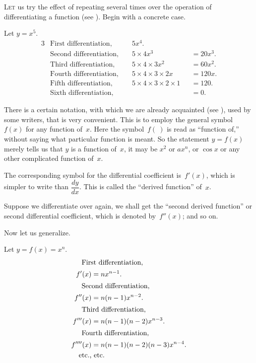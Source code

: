 \documentclass[12pt]{book}[2005/09/16]
\newcommand{\DPPageSep}[2]{\Pagelabel{#2}}
\newcommand{\Pagelabel}[1]
  {\phantomsection\label{#1}}
\newcommand{\Pageref}[2][p.]{%
  \ifthenelse{\not\equal{#1}{}}{%
    \hyperref[#2]{#1~\pageref*{#2}}%
  }{%
    \hyperref[#2]{\pageref{*#2}}%
  }%
}
\newcommand{\First}[1]{\noindent\textsc{#1}}
\begin{document}
\First{Let} us try the effect of repeating several times over
the operation of differentiating a function (see \Pageref{function}).
Begin with a concrete case.

Let $y = x^5$.
\begin{alignat*}{3}
&\text{First differentiation, }  &&5x^4.              &&         \\
&\text{Second differentiation, } &&5 × 4x^3           &&= 20x^3. \\
&\text{Third differentiation, }  &&5 × 4 × 3x^2       &&= 60x^2. \\
&\text{Fourth differentiation, } &&5 × 4 × 3 × 2x     &&= 120x.  \\
&\text{Fifth differentiation, }  &&5 × 4 × 3 × 2 × 1  &&= 120.   \\
&\text{Sixth differentiation, }  &&                   &&= 0.
\end{alignat*}

There is a certain notation, with which we are
already acquainted (see \Pageref{notation}), used by some writers,
that is very convenient. This is to employ the
general symbol~$f(x)$ for any function of~$x$. Here
the symbol~$f(~)$ is read as ``function of,'' without
saying what particular function is meant. So the
statement $y=f(x)$ merely tells us that $y$ is a function
of~$x$, it may be $x^2$ or $ax^n$, or $\cos x$ or any other complicated
function of~$x$.

The corresponding symbol for the differential coefficient
is~$f'(x)$, which is simpler to write than $\dfrac{dy}{dx}$.
This is called the ``derived function'' of~$x$.
\DPPageSep{062.png}{50}%

Suppose we differentiate over again, we shall get
the ``second derived function'' or second differential
coefficient, which is denoted by~$f''(x)$; and so on.

Now let us generalize.

Let $y = f(x) = x^n$.
\begin{align*}[m]
\intertext{\indent First differentiation,}     f'(x) &= nx^{n-1}. \\
\intertext{\indent Second differentiation,}   f''(x) &= n(n-1)x^{n-2}. \\
\intertext{\indent Third differentiation,}   f'''(x) &= n(n-1)(n-2)x^{n-3}. \\
\intertext{\indent Fourth differentiation,} f''''(x) &= n(n-1)(n-2)(n-3)x^{n-4}. \\
    &\llap{\text{etc.,}} \text{ etc.}
\end{align*}
\end{document}
